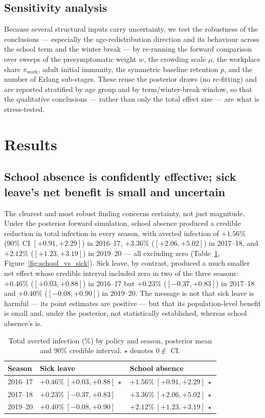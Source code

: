 \documentclass[12pt]{article}
\theoremstyle{plain}
\theoremstyle{remark}
\theoremstyle{definition}
\begin{document}
\subsection{Sensitivity analysis}
\label{sec:sens}
Because several structural inputs carry uncertainty, we test the robustness of the conclusions --- especially the age-redistribution direction and its behaviour across the school term and the winter break --- by re-running the forward comparison over sweeps of the presymptomatic weight $w$, the crowding scale $\mu$, the workplace share $\pi_{\mathrm{work}}$, adult initial immunity, the symmetric baseline retention $p$, and the number of Erlang sub-stages. These reuse the posterior draws (no re-fitting) and are reported stratified by age group and by term/winter-break window, so that the qualitative conclusions --- rather than only the total effect size --- are what is stress-tested.

\section{Results}
\subsection{School absence is confidently effective; sick leave's net benefit is small and uncertain}
The clearest and most robust finding concerns certainty, not just magnitude. Under the posterior forward simulation, school absence produced a credible reduction in total infection in every season, with averted infection of $+1.56\%$ (90\% CI $[+0.91, +2.29]$) in 2016--17, $+3.36\%$ ($[+2.06, +5.02]$) in 2017--18, and $+2.12\%$ ($[+1.23, +3.19]$) in 2019--20 --- all excluding zero (Table~\ref{tab:averted}, Figure~\ref{fig:school_vs_sick}). Sick leave, by contrast, produced a much smaller net effect whose credible interval included zero in two of the three seasons: $+0.46\%$ ($[+0.03, +0.88]$) in 2016--17 but $+0.23\%$ ($[-0.37, +0.83]$) in 2017--18 and $+0.40\%$ ($[-0.08, +0.90]$) in 2019--20. The message is not that sick leave is harmful --- its point estimates are positive --- but that its population-level benefit is small and, under the posterior, not statistically established, whereas school absence's is.

\begin{table}[H]
\centering
\caption{Total averted infection (\%) by policy and season, posterior mean and 90\% credible interval. $\star$ denotes $0 \notin$ CI.}
\label{tab:averted}
\begin{tabular}{@{}lll@{}}
\toprule
Season & Sick leave & School absence \\
\midrule
2016--17 & $+0.46\%\ [+0.03, +0.88]\ \star$ & $+1.56\%\ [+0.91, +2.29]\ \star$ \\
2017--18 & $+0.23\%\ [-0.37, +0.83]$        & $+3.36\%\ [+2.06, +5.02]\ \star$ \\
2019--20 & $+0.40\%\ [-0.08, +0.90]$        & $+2.12\%\ [+1.23, +3.19]\ \star$ \\
\bottomrule
\end{tabular}
\end{table}
\end{document}

